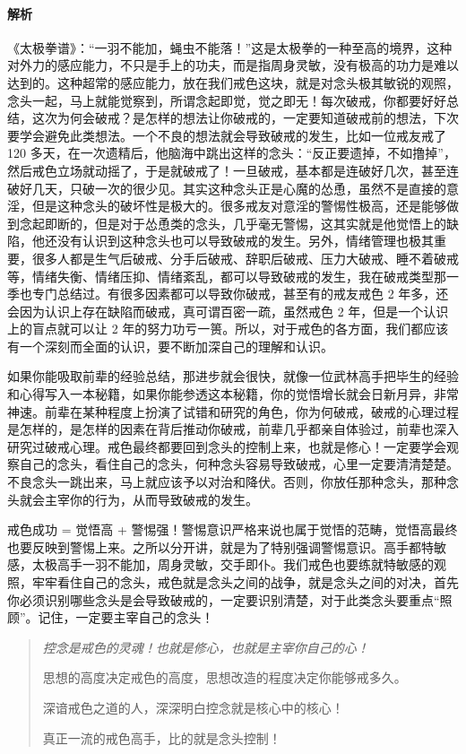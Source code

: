 \paragraph{解析} 《太极拳谱》：“一羽不能加，蝇虫不能落！”这是太极拳的一种至高的境界，这种对外力的感应能力，不只是手上的功夫，而是指周身灵敏，没有极高的功力是难以达到的。这种超常的感应能力，放在我们戒色这块，就是对念头极其敏锐的观照，念头一起，马上就能觉察到，所谓念起即觉，觉之即无！每次破戒，你都要好好总结，这次为何会破戒？是怎样的想法让你破戒的，一定要知道破戒前的想法，下次要学会避免此类想法。一个不良的想法就会导致破戒的发生，比如一位戒友戒了 120 多天，在一次遗精后，他脑海中跳出这样的念头：“反正要遗掉，不如撸掉”，然后戒色立场就动摇了，于是就破戒了！一旦破戒，基本都是连破好几次，甚至连破好几天，只破一次的很少见。其实这种念头正是心魔的怂恿，虽然不是直接的意淫，但是这种念头的破坏性是极大的。很多戒友对意淫的警惕性极高，还是能够做到念起即断的，但是对于怂恿类的念头，几乎毫无警惕，这其实就是他觉悟上的缺陷，他还没有认识到这种念头也可以导致破戒的发生。另外，情绪管理也极其重要，很多人都是生气后破戒、分手后破戒、辞职后破戒、压力大破戒、睡不着破戒等，情绪失衡、情绪压抑、情绪紊乱，都可以导致破戒的发生，我在破戒类型那一季也专门总结过。有很多因素都可以导致你破戒，甚至有的戒友戒色 2 年多，还会因为认识上存在缺陷而破戒，真可谓百密一疏，虽然戒色 2 年，但是一个认识上的盲点就可以让 2 年的努力功亏一篑。所以，对于戒色的各方面，我们都应该有一个深刻而全面的认识，要不断加深自己的理解和认识。

如果你能吸取前辈的经验总结，那进步就会很快，就像一位武林高手把毕生的经验和心得写入一本秘籍，如果你能参透这本秘籍，你的觉悟增长就会日新月异，非常神速。前辈在某种程度上扮演了试错和研究的角色，你为何破戒，破戒的心理过程是怎样的，是怎样的因素在背后推动你破戒，前辈几乎都亲自体验过，前辈也深入研究过破戒心理。戒色最终都要回到念头的控制上来，也就是修心！一定要学会观察自己的念头，看住自己的念头，何种念头容易导致破戒，心里一定要清清楚楚。不良念头一跳出来，马上就应该予以对治和降伏。否则，你放任那种念头，那种念头就会主宰你的行为，从而导致破戒的发生。

戒色成功 = 觉悟高 + 警惕强！警惕意识严格来说也属于觉悟的范畴，觉悟高最终也要反映到警惕上来。之所以分开讲，就是为了特别强调警惕意识。高手都特敏感，太极高手一羽不能加，周身灵敏，交手即仆。我们戒色也要练就特敏感的观照，牢牢看住自己的念头，戒色就是念头之间的战争，就是念头之间的对决，首先你必须识别哪些念头是会导致破戒的，一定要识别清楚，对于此类念头要重点“照顾”。记住，一定要主宰自己的念头！

\begin{quotation}\it
    控念是戒色的灵魂！也就是修心，也就是主宰你自己的心！

    思想的高度决定戒色的高度，思想改造的程度决定你能够戒多久。

    深谙戒色之道的人，深深明白控念就是核心中的核心！

    真正一流的戒色高手，比的就是念头控制！
\end{quotation}

